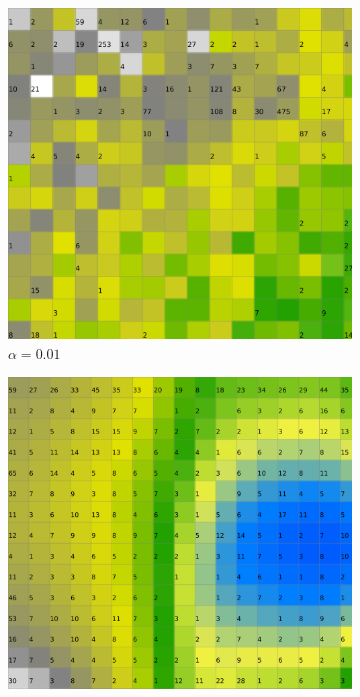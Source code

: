 \documentclass{acm_proc_article-sp}
\begin{document}
\begin{figure}
\centering
    \centering
    \begin{subfigure}[b]{0.24\linewidth}
        \includegraphics[width=\linewidth]{img/wine-20x16-activity-histogram-alpha-0,01}
        \caption{$\alpha=0.01$}
        \label{fig:wine-20x16-activity-histogram-alpha-0,01}
    \end{subfigure}
    \begin{subfigure}[b]{0.24\linewidth}
        \includegraphics[width=\linewidth]{img/wine-20x16-activity-histogram-alpha-0,45}

\end{subfigure}
\end{figure}
\end{document}

